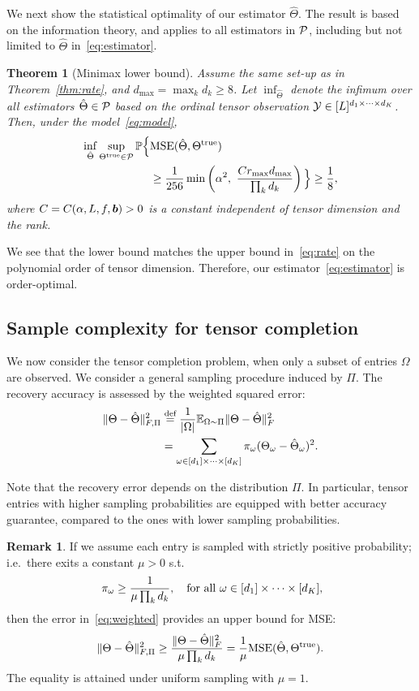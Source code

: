 \documentclass{article}
\theoremstyle{plain}
\newtheorem{thm}{Theorem}[section]
\theoremstyle{definition}
\newtheorem{rmk}{Remark}
\begin{document}
We next show the statistical optimality of our estimator $\hat \Theta$. The result is based on the information theory, and applies to all estimators in $\mathcal{P}$, including but not limited to $\hat \Theta$ in~\eqref{eq:estimator}. 


\begin{thm}[Minimax lower bound]\label{thm:minimax} 
Assume the same set-up as in Theorem~\ref{thm:rate}, and $d_{\max}=\max_k d_k \geq 8$. Let $\inf_{\hat \Theta}$ denote the infimum over all estimators $\hat \Theta\in\mathcal{P}$ based on the ordinal tensor observation $\mathcal{Y}\in[L]^{d_1\times \cdots \times d_K}$. Then, under the model~\eqref{eq:model},
\begin{align}\label{eq:lower}
\inf_{\hat \Theta }\sup_{\Theta^{\text{true}}\in\mathcal{P}} \mathbb{P}\Big\{& \text{MSE}(\hat \Theta, \Theta^{\text{true}}) \\
& \geq {1\over 256} \min\left( \alpha^2, \ { Cr_{\max}d_{\max} \over \prod_k d_k} \right) \Big\} \geq {1\over 8},
\end{align}
where $C=C(\alpha, L, f,\bm{b})>0$ is a constant independent of tensor dimension and the rank. 
\end{thm}
We see that the lower bound matches the upper bound in~\eqref{eq:rate} on the polynomial order of tensor dimension. Therefore, our estimator~\eqref{eq:estimator} is order-optimal. 

\subsection{Sample complexity for tensor completion}
We now consider the tensor completion problem, when only a subset of entries $\Omega$ are observed. We consider a general sampling procedure induced by $\Pi$. The recovery accuracy is assessed by the weighted squared error:
\begin{align}\label{eq:weighted}
\lVert\Theta-\hat \Theta\rVert_{F,\Pi}^2&\stackrel{\text{def}}{=}
{1\over |\Omega|}\mathbb{E}_{\Omega\sim \Pi}\lVert\Theta-\hat \Theta\rVert_F^2\notag \\
&=\sum_{\omega\in[d_1]\times \cdots \times [d_K]} \pi_{\omega}(\Theta_{\omega}-\hat \Theta_{\omega})^2.
\end{align}

Note that the recovery error depends on the distribution $\Pi$. In particular, tensor entries with higher sampling probabilities are equipped with better accuracy guarantee, compared to the ones with lower sampling probabilities. 

\begin{rmk} If we assume each entry is sampled with strictly positive probability; i.e.\ there exits a constant $\mu> 0$ s.t.
\[
\ \pi_\omega\geq {1\over \mu \prod_k d_k},\quad \text{for all}\ \omega\in[d_1]\times\cdots \times [d_K],
\]
then the error in~\eqref{eq:weighted} provides an upper bound for MSE:
\[
\lVert\Theta-\hat \Theta\rVert_{F,\Pi}^2 \geq {\lVert\Theta-\hat \Theta\rVert_F^2\over \mu \prod_kd_k}={1\over \mu}\text{MSE}(\hat \Theta, \Theta^{\text{true}}).
\]
The equality is attained under uniform sampling with $\mu=1$. 
\end{rmk}
\end{document}

